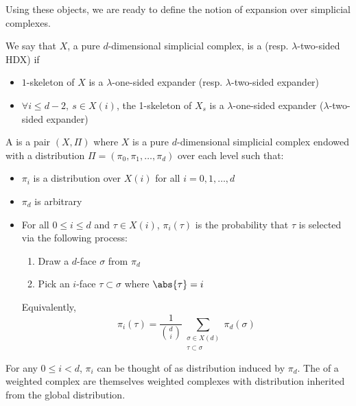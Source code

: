 Using these objects, we are ready to define the notion of expansion over 
simplicial complexes. 

\begin{definition}
    We say that \(X\), a pure \(d\)-dimensional simplicial complex, is a 
     (resp. \(\lambda\)-two-sided HDX) if 
    \begin{itemize}
        \item \(1\)-skeleton of \(X\) is a \(\lambda\)-one-sided expander (resp. \(\lambda\)-two-sided expander)  
        \item \(\forall i \leqslant d-2, \  s \in X(i)\), the 1-skeleton of \(X_s\) is a \(\lambda\)-one-sided expander 
        (\(\lambda\)-two-sided expander)    
    \end{itemize}
\end{definition}

\begin{definition}
    A  is a pair \((X, \Pi)\) where \(X\) is 
    a pure \(d\)-dimensional simplicial complex endowed with a distribution \(\Pi 
    = \left(\pi_{0}, \pi_1, \dots , \pi_d \right)\) over 
    each level such that:     
    \begin{itemize}
        \item \(\pi_i\) is a distribution over \(X(i)\) for all \(i = 0, 1, \dots , d\)  
        \item \(\pi_d\) is arbitrary
        \item For all \(0 \leq i \leq d\) and \(\tau \in X(i)\), \(\pi_i(\tau)\) is the 
        probability that \(\tau\) is selected via the following process: 
        \begin{enumerate}
            \item Draw a \(d\)-face \(\sigma\) from \(\pi_d\) 
            \item Pick an \(i\)-face \(\tau \subset \sigma\) where \(\abs{\tau} = i \)  
        \end{enumerate}     
        Equivalently, 
        \begin{equation}
            \pi_i (\tau) = \frac{1}{\binom{d}{i}} \sum_{\substack{\sigma \in X(d)\\ \tau \subset \sigma}} \pi_d(\sigma) 
        \end{equation}
    \end{itemize}
\end{definition}

For any \(0 \leq i < d\), \(\pi_i\) can be thought of as distribution induced by \(\pi_d\). The  of a weighted complex are themselves weighted complexes with distribution inherited from the global distribution.

